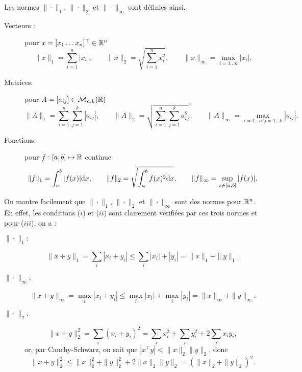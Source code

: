 \begin{definition}
  Les normes $\|\cdot\|_1$, $\|\cdot\|_2$ et $\|\cdot\|_\infty$ sont définies ainsi.
  \begin{description}
    \item[Vecteurs :] pour $x = [x_1 \dots x_n]^\top \in \mathbb{R}^n$
    $$
    \|x\|_1 = \sum_{i=1}^n |x_i|, \qquad 
    \|x\|_2 = \sqrt{\sum_{i=1}^n x_i^2}, \qquad 
    \|x\|_\infty = \max_{i = 1 \dots n} |x_i|. 
    $$
    \item[Matrices:] pour $A = [a_{ij}] \in \mathcal{M}_{n, k}(\mathbb{R})$
    $$
    \|A\|_1 = \sum_{i=1}^n \sum_{j=1}^k |a_{ij}|, \qquad 
    \|A\|_2 = \sqrt{\sum_{i=1}^n \sum_{j=1}^k a_{ij}^2}, \qquad 
    \|A\|_\infty = \max_{i = 1 \dots n, j = 1 \dots k} |a_{ij}|. 
    $$
    \item[Fonctions:] pour $f : [a, b] \mapsto \mathbb{R}$ continue
    $$
    \|f\|_1 = \int_a^b |f(x)| \text{d} x, \qquad 
    \|f\|_2 = \sqrt{\int_a^b f(x)^2 \text{d} x}, \qquad 
    \|f\|_\infty = \sup_{x \in [a, b]} |f(x)|.
    $$
  \end{description}
\end{definition}


\remark
On montre facilement que $\|\cdot\|_1$, $\|\cdot\|_2$ et $\|\cdot\|_\infty$ sont des normes pour $\mathbb{R}^n$. En effet, les conditions ($i$) et ($ii$) sont clairement vérifiées par ces trois normes et pour ($iii$), on a :
\begin{description}
  \item[$\|\cdot\|_1:$] 
  $$\|x+y\|_1 = \sum_i |x_i + y_i| \leq \sum_i |x_i| + |y_i| =  \|x\|_1 + \|y\|_1.$$
  \item[$\|\cdot\|_\infty:$] 
  $$\|x+y\|_\infty = \max_i |x_i + y_i| \leq \max_i |x_i| + \max_i |y_i| =  \|x\|_\infty + \|y\|_\infty.$$
  \item[$\|\cdot\|_2:$] 
  $$\|x+y\|^2_2 = \sum_i (x_i + y_i)^2 = \sum_i x_i^2 + \sum_i y_i^2 + 2 \sum_i x_i y_i,$$ 
  or, par Cauchy-Schwarz, on sait que $|x^\top y| < \|x\|_2 \|y\|_2$, donc 
  $$\|x+y\|^2_2 \leq \|x\|_2^2 + \|y\|_2^2 + 2 \|x\|_2 \|y\|_2 = (\|x\|_2 + \|y\|_2)^2.$$
\end{description}

